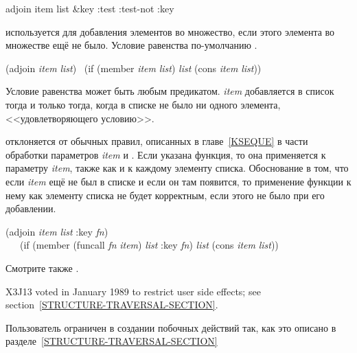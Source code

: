 \begin{defun}[Функция]
adjoin item list &key :test :test-not :key

 используется для добавления элементов во множество, если этого
элемента во множестве ещё не было. Условие равенства по-умолчанию .
\begin{lisp}
(adjoin \emph{item} \emph{list}) \EQ\ (if (member \emph{item} \emph{list}) \emph{list} (cons \emph{item} \emph{list}))
\end{lisp}
Условие равенства может быть любым предикатом. \emph{item} добавляется в список
тогда и только тогда, когда в списке не было ни одного элемента,
<<удовлетворяющего условию>>.

 отклоняется от обычных правил, описанных в главе~\ref{KSEQUE} в
части обработки параметров \emph{item} и .
Если указана  функция, то она применяется к параметру \emph{item}, также
как и к каждому элементу списка. Обоснование в том, что если \emph{item} ещё не
был в списке и если он там появится, то применение функции  к нему как
элементу списка не будет корректным, если этого не было при его добавлении.
\begin{lisp}
(adjoin \emph{item} \emph{list} :key \emph{fn}) \\
~~\EQ\ (if (member (funcall \emph{fn} \emph{item}) \emph{list}
  :key \emph{fn}) \emph{list} (cons \emph{item} \emph{list})) 
\end{lisp}

Смотрите также .

\begin{new}
X3J13 voted in January 1989
to restrict user side effects; see section~\ref{STRUCTURE-TRAVERSAL-SECTION}.
\end{new}

Пользователь ограничен в создании побочных действий так, как это описано в
разделе~\ref{STRUCTURE-TRAVERSAL-SECTION}
\end{defun}

